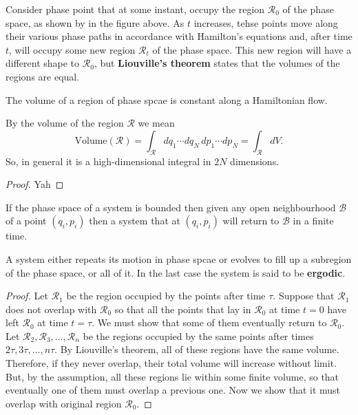 \documentclass[12pt, a4paper]{article}
\begin{document}
Consider phase point that at some instant, occupy the region \(\mathcal{R}_0\) of the phase space, as shown by in the figure above. As \(t\) increases, tehse points move along their various phase paths in accordance with Hamilton's equations and, after time \(t\), will occupy some new region \(\mathcal{R}_t\) of the phase space. This new region will have a different shape to \(\mathcal{R}_0\), but \textbf{Liouville's theorem} states that the volumes of the regions are equal.

\begin{mdthm}
    The volume of a region of phase spcae is constant along a Hamiltonian flow. 
\end{mdthm}

\begin{mdremark}
    By the volume of the region \(\mathcal{R}\) we mean
    \[\text{Volume}(\mathcal{R}) = \int_{\mathcal{R}} dq_1 \cdots dq_N \, dp_1 \cdots dp_N = \int_{\mathcal{R}} dV.\] 
    So, in general it is a high-dimensional integral in \(2N\) dimensions.
\end{mdremark}

\begin{proof}
    Yah 
\end{proof}

\begin{mdthm}
    If the phase space of a system is bounded then given any open neighbourhood \(\mathcal{B}\) of a point \((q_i,p_i)\) then a system that at \((q_i,p_i)\) will return to \(\mathcal{B}\) in a finite time.
\end{mdthm}

\begin{mdremark}
    A system either repeats its motion in phase spcae or evolves to fill up a subregion of the phase space, or all of it. In the last case the system is said to be \textbf{ergodic}.
\end{mdremark}

\begin{proof}
    Let \(\mathcal{R}_1\) be the region occupied by the points after time \(\tau\). Suppose that \(\mathcal{R}_1\) does not overlap with \(\mathcal{R}_0\) so that all the points that lay in \(\mathcal{R}_0\) at time \(t=0\) have left \(\mathcal{R}_0\) at time \(t=\tau\). We must show that some of them eventually return to \(\mathcal{R}_0\). Let \(\mathcal{R}_2,\mathcal{R}_3, \ldots, \mathcal{R}_n\) be the regions occupied by the same points after times \(2\tau,3\tau, \ldots, n \tau\). By Liouville's theorem, all of these regions have the same volume. Therefore, if they never overlap, their total volume will increase without limit. But, by the assumption, all these regions lie within some finite volume, so that eventually one of them must overlap a previous one. Now we show that it must overlap with original region \(\mathcal{R}_0\).
\end{proof}
\end{document}
